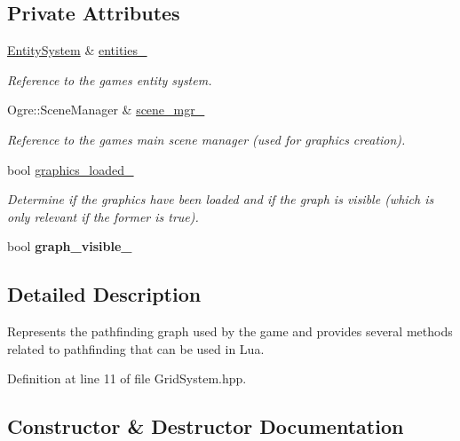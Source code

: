 \subsection*{Private Attributes}
\begin{DoxyCompactItemize}
\item 
\hyperlink{class_entity_system}{Entity\+System} \& \hyperlink{class_grid_system_a76b61fafd9e04fe8a6b67c327d2eeac5}{entities\+\_\+}
\begin{DoxyCompactList}\small\item\em Reference to the game\textquotesingle{}s entity system. \end{DoxyCompactList}\item 
Ogre\+::\+Scene\+Manager \& \hyperlink{class_grid_system_a01626368dc7fde9dfc4b7961aa93cfe9}{scene\+\_\+mgr\+\_\+}
\begin{DoxyCompactList}\small\item\em Reference to the game\textquotesingle{}s main scene manager (used for graphics creation). \end{DoxyCompactList}\item 
bool \hyperlink{class_grid_system_a449d916909013f7d41f81e1ff236d0f6}{graphics\+\_\+loaded\+\_\+}
\begin{DoxyCompactList}\small\item\em Determine if the graphics have been loaded and if the graph is visible (which is only relevant if the former is true). \end{DoxyCompactList}\item 
bool {\bfseries graph\+\_\+visible\+\_\+}\hypertarget{class_grid_system_aeb08f54fd4ce73243bc7ebe0b226147a}{}\label{class_grid_system_aeb08f54fd4ce73243bc7ebe0b226147a}

\end{DoxyCompactItemize}


\subsection{Detailed Description}
Represents the pathfinding graph used by the game and provides several methods related to pathfinding that can be used in Lua. 

Definition at line 11 of file Grid\+System.\+hpp.



\subsection{Constructor \& Destructor Documentation}
